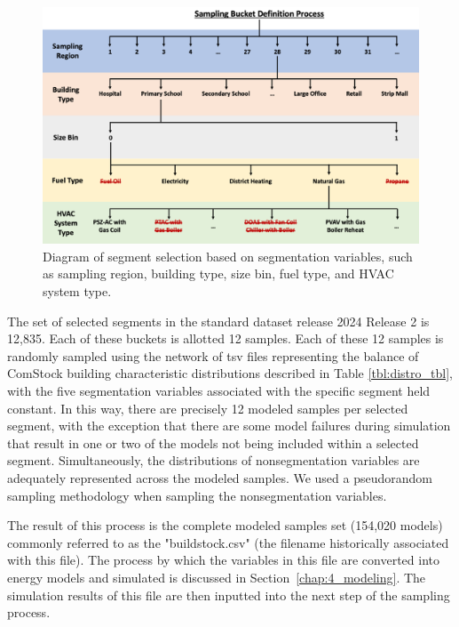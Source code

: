 \begin{figure}
  \centering \includegraphics[width=1\textwidth]{figures/sampling_bucket_definition_process.png}
  \caption{Diagram of segment selection based on segmentation variables, such as sampling region, building type, size bin, fuel type, and HVAC system type.}
   \label{fig:sampling_bucket_definition_process}
\end{figure}

The set of selected segments in the standard dataset release 2024 Release 2 is 12,835. Each of these buckets is allotted 12 samples. Each of these 12 samples is randomly sampled using the network of tsv files representing the balance of ComStock building characteristic distributions described in Table \ref{tbl:distro_tbl}, with the five segmentation variables associated with the specific segment held constant. In this way, there are precisely 12 modeled samples per selected segment, with the exception that there are some model failures during simulation that result in one or two of the models not being included within a selected segment. Simultaneously, the distributions of nonsegmentation variables are adequately represented across the modeled samples. We used a pseudorandom sampling methodology when sampling the nonsegmentation variables.

The result of this process is the complete modeled samples set (154,020 models) commonly referred to as the "buildstock.csv" (the filename historically associated with this file). The process by which the variables in this file are converted into energy models and simulated is discussed in Section~\ref{chap:4_modeling}. The simulation results of this file are then inputted into the next step of the sampling process.

